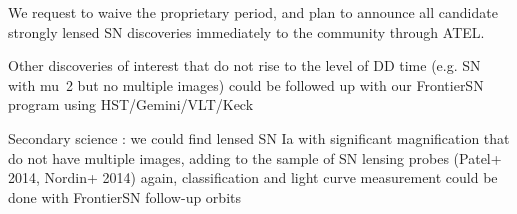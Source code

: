 We request to waive the proprietary period, and plan to announce all
     candidate strongly lensed SN discoveries immediately to the
     community through ATEL.

Other discoveries of interest that do not rise to the level of DD time (e.g. SN with mu~2 but no multiple images) could be followed up with our FrontierSN program using HST/Gemini/VLT/Keck




Secondary science : 
    we could find lensed SN Ia with significant magnification that do not have multiple images, adding to the sample of SN lensing probes (Patel+ 2014, Nordin+ 2014)
      again, classification and light curve measurement could be done with FrontierSN follow-up orbits












